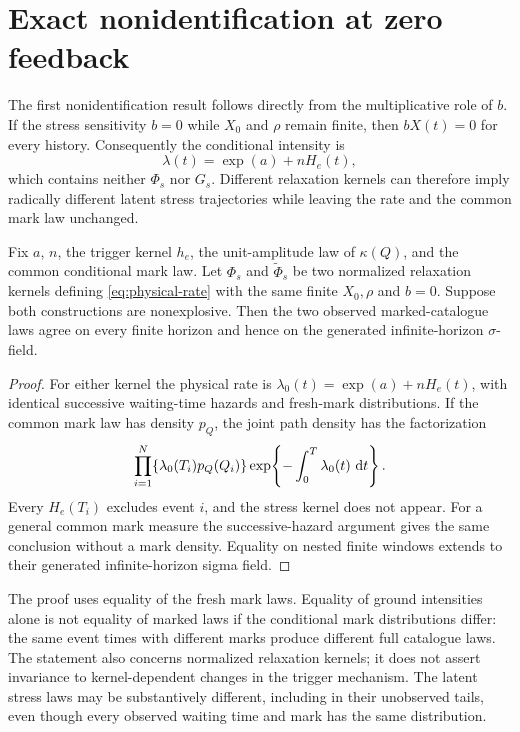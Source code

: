 \section{Exact nonidentification at zero feedback}

The first nonidentification result follows directly from the multiplicative role of \(b\). If the stress sensitivity \(b=0\) while \(X_0\) and \(\rho\) remain finite, then \(bX(t)=0\) for every history. Consequently the conditional intensity is
\[
\lambda(t)=\exp(a)+nH_e(t),
\]
which contains neither \(\Phi_s\) nor \(G_s\). Different relaxation kernels can therefore imply radically different latent stress trajectories while leaving the rate and the common mark law unchanged.

\begin{proposition}
\label{prop:nonidentification}
Fix \(a\), \(n\), the trigger kernel \(h_e\), the unit-amplitude law of \(\kappa(Q)\), and the common conditional mark law. Let \(\Phi_s\) and \(\widetilde\Phi_s\) be two normalized relaxation kernels defining \eqref{eq:physical-rate} with the same finite \(X_0,\rho\) and \(b=0\). Suppose both constructions are nonexplosive. Then the two observed marked-catalogue laws agree on every finite horizon and hence on the generated infinite-horizon \(\sigma\)-field.
\end{proposition}

\begin{proof}
For either kernel the physical rate is \(\lambda_0(t)=\exp(a)+nH_e(t)\), with identical successive waiting-time hazards and fresh-mark distributions. If the common mark law has density \(p_Q\), the joint path density has the factorization
\[
\prod_{i=1}^{N}\{\lambda_0(T_i)p_Q(Q_i)\}
\exp\!\left\{-\int_0^T\lambda_0(t)\,\mathop{}\!\mathrm{d} t\right\}.
\]
Every \(H_e(T_i)\) excludes event \(i\), and the stress kernel does not appear. For a general common mark measure the successive-hazard argument gives the same conclusion without a mark density. Equality on nested finite windows extends to their generated infinite-horizon sigma field.
\end{proof}

The proof uses equality of the fresh mark laws. Equality of ground intensities alone is not equality of marked laws if the conditional mark distributions differ: the same event times with different marks produce different full catalogue laws. The statement also concerns normalized relaxation kernels; it does not assert invariance to kernel-dependent changes in the trigger mechanism. The latent stress laws may be substantively different, including in their unobserved tails, even though every observed waiting time and mark has the same distribution.

